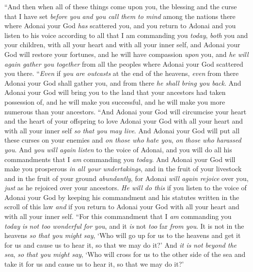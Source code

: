 \begin{biblechapter} %
\verse “And then when all of these things come upon you, the blessing and the curse that I have set \textit{before you} \textit{and you call them to mind} among the nations there where Adonai your God \textit{has} scattered you,
\verse and you return to Adonai and you listen to his voice according to all that I am commanding you \textit{today}, \textit{both} you and your children, with all your heart and with all your inner self,
\verse and Adonai your God will restore your fortunes, and he will have compassion \textit{upon} you, and \textit{he will again gather you together} from all the peoples where Adonai your God scattered you there.
\verse “\textit{Even} if \textit{you are outcasts} at the end of the heavens, \textit{even} from there Adonai your God shall gather you, and from there \textit{he shall bring you back}.
\verse And Adonai your God will bring you to the land that your ancestors had taken possession of, and he will make you successful, and he will make you more numerous than your ancestors.
\verse “And Adonai your God will circumcise your heart and the heart of your offspring to love Adonai your God with all your heart and with all your inner self \textit{so that you may live}.
\verse And Adonai your God will put all these curses on your enemies and \textit{on those who hate you}, \textit{on} \textit{those who harassed you}.
\verse And \textit{you will again listen} to the voice of Adonai, and you will do all his commandments that I \textit{am} commanding you \textit{today}.
\verse And Adonai your God will make you prosperous \textit{in all your undertakings}, and in the fruit of your livestock and in the fruit of your ground \textit{abundantly}, for Adonai \textit{will again rejoice} over you, \textit{just} as he rejoiced over your ancestors.
\verse \textit{He will do this} if you listen to the voice of Adonai your God by keeping his commandment and his statutes written in the scroll of this law \textit{and} if you return to Adonai your God with all your heart and with all your inner self.
\verse “For this commandment that I \textit{am} commanding you \textit{today} \textit{is} \textit{not too wonderful for you}, and it \textit{is} not \textit{too} far \textit{from you}.
\verse It is not in the heavens \textit{so that you might say}, ‘Who will go up for us to the heavens and get it for us and cause us to hear it, so that we may do it?’
\verse And \textit{it is} \textit{not beyond the sea}, \textit{so that you might say}, ‘Who will cross for us to the other side of the sea and take it for us and cause us to hear it, so that we may do it?’

\end{biblechapter}
